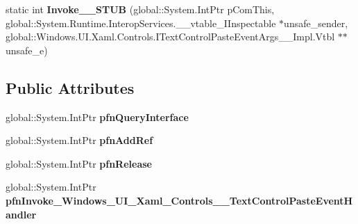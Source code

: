 \begin{DoxyCompactItemize}
\item 
\mbox{\label{struct_windows_1_1_u_i_1_1_xaml_1_1_controls_1_1_text_control_paste_event_handler_____impl_1_1_vtbl_af937f1205a9d6639a2cba47e2dd21354}} 
static int {\bfseries Invoke\+\_\+\+\_\+\+S\+T\+UB} (global\+::\+System.\+Int\+Ptr p\+Com\+This, global\+::\+System.\+Runtime.\+Interop\+Services.\+\_\+\+\_\+vtable\+\_\+\+I\+Inspectable $\ast$unsafe\+\_\+sender, global\+::\+Windows.\+U\+I.\+Xaml.\+Controls.\+I\+Text\+Control\+Paste\+Event\+Args\+\_\+\+\_\+\+Impl.\+Vtbl $\ast$$\ast$unsafe\+\_\+e)
\end{DoxyCompactItemize}
\subsection*{Public Attributes}
\begin{DoxyCompactItemize}
\item 
\mbox{\label{struct_windows_1_1_u_i_1_1_xaml_1_1_controls_1_1_text_control_paste_event_handler_____impl_1_1_vtbl_a144440b2318492e12cdff7049aff319b}} 
global\+::\+System.\+Int\+Ptr {\bfseries pfn\+Query\+Interface}
\item 
\mbox{\label{struct_windows_1_1_u_i_1_1_xaml_1_1_controls_1_1_text_control_paste_event_handler_____impl_1_1_vtbl_a134bcc3b37e2fade153dab57a24b56ae}} 
global\+::\+System.\+Int\+Ptr {\bfseries pfn\+Add\+Ref}
\item 
\mbox{\label{struct_windows_1_1_u_i_1_1_xaml_1_1_controls_1_1_text_control_paste_event_handler_____impl_1_1_vtbl_ac14b7ca0ce91baa046026308fe2612c2}} 
global\+::\+System.\+Int\+Ptr {\bfseries pfn\+Release}
\item 
\mbox{\label{struct_windows_1_1_u_i_1_1_xaml_1_1_controls_1_1_text_control_paste_event_handler_____impl_1_1_vtbl_a57af0788bce716250ae3647540338af7}} 
global\+::\+System.\+Int\+Ptr {\bfseries pfn\+Invoke\+\_\+\+Windows\+\_\+\+U\+I\+\_\+\+Xaml\+\_\+\+Controls\+\_\+\+\_\+\+Text\+Control\+Paste\+Event\+Handler}
\end{DoxyCompactItemize}
